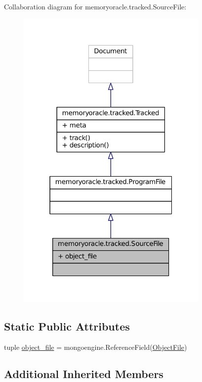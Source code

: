 Collaboration diagram for memoryoracle.\+tracked.\+Source\+File\+:
\nopagebreak
\begin{figure}[H]
\begin{center}
\leavevmode
\includegraphics[width=265pt]{classmemoryoracle_1_1tracked_1_1SourceFile__coll__graph}
\end{center}
\end{figure}
\subsection*{Static Public Attributes}
\begin{DoxyCompactItemize}
\item 
tuple \hyperlink{classmemoryoracle_1_1tracked_1_1SourceFile_a1e1996b8f71968e4cf6f9e5cc57bc14c}{object\+\_\+file} = mongoengine.\+Reference\+Field(\hyperlink{classmemoryoracle_1_1tracked_1_1ObjectFile}{Object\+File})
\end{DoxyCompactItemize}
\subsection*{Additional Inherited Members}


